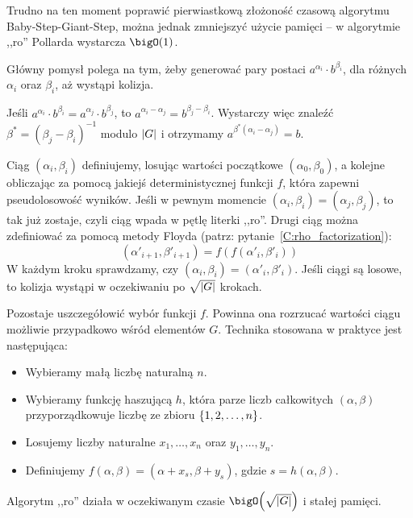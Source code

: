 Trudno na ten moment poprawić pierwiastkową złożoność czasową algorytmu Baby-Step-Giant-Step, można jednak zmniejszyć użycie pamięci -- w algorytmie ,,ro'' Pollarda wystarcza \( \bigO(1) \).

Główny pomysł polega na tym, żeby generować pary postaci \( a^{\alpha_i} \cdot b^{\beta_i} \), dla różnych \( \alpha_i \) oraz \( \beta_i \), aż wystąpi kolizja.

Jeśli \( a^{\alpha_i} \cdot b^{\beta_i} = a^{\alpha_j} \cdot b^{\beta_j} \), to \( a^{\alpha_i - \alpha_j} = b^{\beta_j - \beta_i} \). Wystarczy więc znaleźć \( \beta^{*} = (\beta_j - \beta_i)^{-1} \) modulo \( \left\lvert G\right\rvert \) i otrzymamy \( a^{\beta^{*} (\alpha_i - \alpha_j)} = b \).

Ciąg \( (\alpha_i, \beta_i) \) definiujemy, losując wartości początkowe \( (\alpha_0, \beta_0) \), a kolejne obliczając za pomocą jakiejś deterministycznej funkcji \( f \), która zapewni pseudolosowość wyników.
Jeśli w pewnym momencie \( (\alpha_i, \beta_i) = (\alpha_j, \beta_j) \), to tak już zostaje, czyli ciąg wpada w pętlę literki ,,ro''. Drugi ciąg można zdefiniować za pomocą metody Floyda (patrz: pytanie~\ref{C:rho_factorization}):
\[ (\alpha'_{i+1}, \beta'_{i+1}) = f(f(\alpha'_i, \beta'_i)) \]
W każdym kroku sprawdzamy, czy \( (\alpha_i, \beta_i) = (\alpha'_i, \beta'_i) \). Jeśli ciągi są losowe, to kolizja wystąpi w oczekiwaniu po \( \sqrt{\left\lvert G\right\rvert} \) krokach.

Pozostaje uszczegółowić wybór funkcji \( f \). Powinna ona rozrzucać wartości ciągu możliwie przypadkowo wśród elementów \( G \). Technika stosowana w praktyce jest następująca:
\begin{itemize}
	\onehalfspacing
	\item Wybieramy małą liczbę naturalną \( n \).
	\item Wybieramy funkcję haszującą \( h \), która parze liczb całkowitych \( (\alpha, \beta) \) przyporządkowuje liczbę ze zbioru \( \set{1, 2, \dots, n} \).
	\item Losujemy liczby naturalne \( x_1, \dots, x_n \) oraz \( y_1, \dots, y_n \).
	\item Definiujemy \( f(\alpha, \beta) = (\alpha + x_s, \beta + y_s) \), gdzie \( s = h(\alpha, \beta) \).
\end{itemize}

Algorytm ,,ro'' działa w oczekiwanym czasie \( \bigO\pars{\sqrt{\abs{G}}} \) i stałej pamięci.